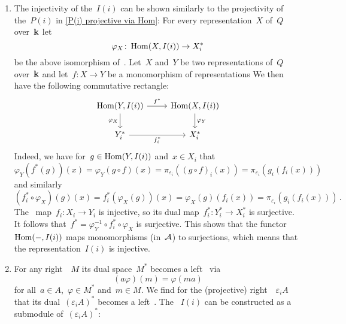 \begin{remark*}
  \leavevmode
  \begin{enumerate}
    \item
      The injectivity of the~$I(i)$ can be shown similarly to the projectivity of the~$P(i)$ in \cref{P(i) projective via Hom}:
      For every representation~$X$ of~$Q$ over~$\mathbf{k}$ let
      \[
        \varphi_X
        \colon
        \operatorname{Hom}(X, I(i))
        \to
        X_i^*
      \]
      be the above isomorphism of~{\kvss}.
      Let~$X$ and~$Y$ be two representations of~$Q$ over~$\mathbf{k}$ and let~$f \colon X \to Y$ be a monomorphism of representations
      We then have the following commutative rectangle:
      \[
        \begin{tikzcd}
            \Hom(Y, I(i))
            \arrow{r}[above]{f^*}
            \arrow{d}[left]{\varphi_X}
          & \Hom(X, I(i))
            \arrow{d}[right]{\varphi_Y}
          \\
            Y_i^*
            \arrow{r}[below]{f_i^*}
          & X_i^*
        \end{tikzcd}
      \]
      Indeed, we have for~$g \in \operatorname{Hom}(Y,I(i))$ and~$x \in X_i$ that
      \[
        \varphi_Y( f^*(g) )(x)
        =
        \varphi_Y( g \circ f )(x)
        =
        \pi_{\varepsilon_i}( (g \circ f)_i(x) )
        =
        \pi_{\varepsilon_i}( g_i( f_i(x) ) )
      \]
      and similarly
      \[
        (f_i^* \circ \varphi_X)(g)(x)
        =
        f_i^*( \varphi_X(g) )(x)
        =
        \varphi_X(g)( f_i(x) )
        =
        \pi_{\varepsilon_i}( g_i( f_i(x) ) )  \,.
      \]
      The~{\klin} map~$f_i \colon X_i \to Y_i$ is injective, so its dual map~$f_i^* \colon Y_i^* \to X_i^*$ is surjective.
      It follows that~$f^* = \varphi_Y^{-1} \circ f_i^* \circ \varphi_X$ is surjective.
      This shows that the functor~$\operatorname{Hom}(-,I(i))$ maps monomorphisms (in~$\mathcal{A}$) to surjections, which means that the representation~$I(i)$ is injective.
    \item
      For any right~{}~$M$ its dual space~$M^*$ becomes a left~{} via
      \[
        (a \varphi)(m)
        =
        \varphi(m a) 
      \]
      for all~$a \in A$,~$\varphi \in M^*$ and~$m \in M$.
      We find for the (projective) right~{}~$\varepsilon_i A$ that its dual~$(\varepsilon_i A)^*$ becomes a left~{}.
      The {}~$I(i)$ can be constructed as a submodule of~$(\varepsilon_i A)^*$:
      

\end{enumerate}
\end{remark*}
